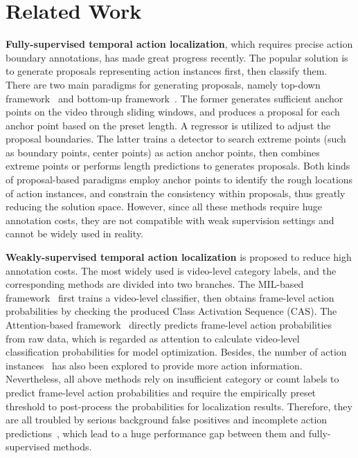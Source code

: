 \documentclass[final]{cvpr}
\begin{document}
\section{Related Work}
\textbf{Fully-supervised temporal action localization}, which requires precise action boundary annotations, has made great progress recently. The popular solution is to generate proposals representing action instances first, then classify them. There are two main paradigms for generating proposals, namely top-down framework~\cite{shou2016temporal,shou2017cdc,gao2017turn,chao2018rethinking} and bottom-up framework~\cite{zhao2017temporal,lin2018bsn,lin2019bmn,lin2019fast}.
The former generates sufficient anchor points on the video through sliding windows, and produces a proposal for each anchor point based on the preset length. A regressor is utilized to adjust the proposal boundaries.
The latter trains a detector to search extreme points (such as boundary points, center points) as action anchor points, then combines extreme points or performs length predictions to generates proposals.
Both kinds of proposal-based paradigms employ anchor points to identify the rough locations of action instances, and constrain the consistency within proposals, thus greatly reducing the solution space.
However, since all these methods require huge annotation costs, they are not compatible with weak supervision settings and cannot be widely used in reality.





\textbf{Weakly-supervised temporal action localization} is proposed to reduce high annotation costs.
The most widely used is video-level category labels, and the corresponding methods are divided into two branches. The MIL-based framework~\cite{paul2018w,lee2019background,liu2019completeness,narayan20193c} first trains a video-level classifier, then obtains frame-level action probabilities by checking the produced Class Activation Sequence (CAS). The Attention-based framework~\cite{nguyen2019weakly,nguyen2018weakly,shou2018autoloc,liu2019weakly} directly predicts frame-level action probabilities from raw data, which is regarded as attention to calculate video-level classification probabilities for model optimization. Besides, the number of action instances~\cite{narayan20193c,xu2018segregated} has also been explored to provide more action information.
Nevertheless, all above methods rely on insufficient category or count labels to predict frame-level action probabilities and require the empirically preset threshold to post-process the probabilities for localization results. Therefore, they are all troubled by serious background false positives and incomplete action predictions~\cite{nguyen2019weakly,lee2019background,liu2019completeness}, which lead to a huge performance gap between them and fully-supervised methods.
\end{document}
